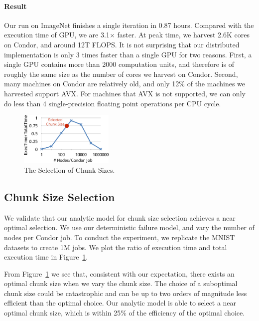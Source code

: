 \documentclass[11pt]{article}
\begin{document}
\paragraph*{Result} Our run on ImageNet finishes a single
iteration in 0.87 hours. Compared with the execution time of
GPU, we are 3.1$\times$ faster. At peak time, we harvest
2.6K cores on Condor, and around 12T FLOPS. It is not surprising
that our distributed implementation is only 3 times faster
than a single GPU for two reasons. First, a single GPU contains
more than 2000 computation units, and therefore is of roughly
the same size as the number of cores we harvest on Condor.
Second, many machines on Condor are relatively old, and only 12\%
of the machines we harvested support AVX. For machines that
AVX is not supported, we can only do less than 4 single-precision
floating point operations per CPU cycle.


\begin{figure}[t]
\centering
\includegraphics[width=0.4\textwidth]{figures/chunk-crop}
\caption{The Selection of Chunk Sizes.}
\label{fig:chunksize}
\end{figure}


\subsection{Chunk Size Selection}

We validate that our analytic model for chunk size selection
achieves a near optimal selection. We use our deterministic
failure model, and vary the number of nodes per Condor job.
To conduct the experiment, we replicate the MNIST datasets
to create 1M jobs. We plot the ratio of execution
time and total execution time in Figure~\ref{fig:chunksize}.

From Figure~\ref{fig:chunksize} we see that, consistent
with our expectation, there exists an optimal chunk size
when we vary the chunk size. The choice of a suboptimal
chunk size could be catastrophic and can be up to
two orders of magnitude less efficient than the optimal choice.
Our analytic model is able to select a near optimal
chunk size, which is within 25\% of the efficiency of 
the optimal choice.
\end{document}
